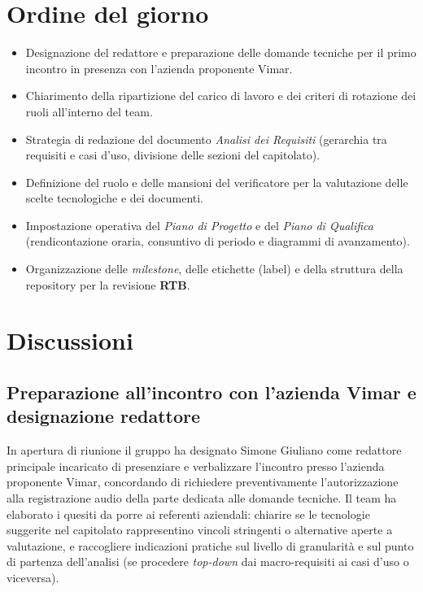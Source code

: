 \documentclass[11pt, a4paper]{article}
\begin{document}
\section{Ordine del giorno}
\begin{itemize}
    \item Designazione del redattore e preparazione delle domande tecniche per il primo incontro in presenza con l'azienda proponente Vimar.
    \item Chiarimento della ripartizione del carico di lavoro e dei criteri di rotazione dei ruoli all'interno del team.
    \item Strategia di redazione del documento \textit{Analisi dei Requisiti} (gerarchia tra requisiti e casi d'uso, divisione delle sezioni del capitolato).
    \item Definizione del ruolo e delle mansioni del verificatore per la valutazione delle scelte tecnologiche e dei documenti.
    \item Impostazione operativa del \textit{Piano di Progetto} e del \textit{Piano di Qualifica} (rendicontazione oraria, consuntivo di periodo e diagrammi di avanzamento).
    \item Organizzazione delle \textit{milestone}, delle etichette (label) e della struttura della repository per la revisione \textbf{RTB}.
\end{itemize}

\newpage

\section{Discussioni}

\subsection{Preparazione all'incontro con l'azienda Vimar e designazione redattore}
In apertura di riunione il gruppo ha designato Simone Giuliano come redattore principale incaricato di presenziare e verbalizzare l'incontro presso l'azienda proponente Vimar, concordando di richiedere preventivamente l'autorizzazione alla registrazione audio della parte dedicata alle domande tecniche. Il team ha elaborato i quesiti da porre ai referenti aziendali: chiarire se le tecnologie suggerite nel capitolato rappresentino vincoli stringenti o alternative aperte a valutazione, e raccogliere indicazioni pratiche sul livello di granularità e sul punto di partenza dell'analisi (se procedere \textit{top-down} dai macro-requisiti ai casi d'uso o viceversa).
\end{document}
